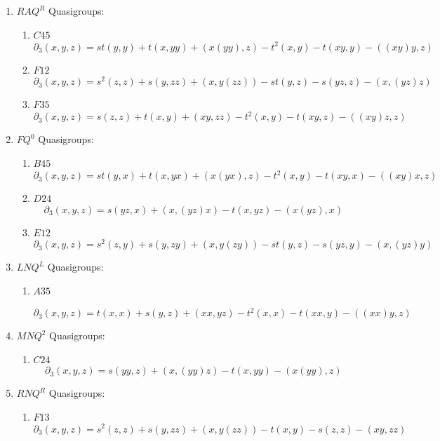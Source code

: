 \documentclass[11pt]{amsart}
\theoremstyle{definition}
\begin{document}
\begin{enumerate}
\item[(22)] $RAQ^R$ Quasigroups:

    \begin{enumerate}
        \item $C45$
        \[ \partial_3(x,y,z)=st (y, y)  + 
 t (x, y y) + (x (y y), z)  - t^2 (x, y) - t(x y, y)    -((x y) y, z) \]
        \item $F12$
        \[ \partial_3(x,y,z)=s^2 (z, z) + s (y, z z) + (x, y (z z)) - st (y, z)  - s (y z, z)     - (x, (y z) z) \]
        \item $F35$
        \[ \partial_3(x,y,z)= s (z, z) + t (x, y) + (x y, z z)- t^2 (x, y)    - 
 t (x y, z)    - ((x y) z, z)   \]
    \end{enumerate}

\item[(23)] $FQ^0$ Quasigroups:

    \begin{enumerate}
        \item $B45$
        \[ \partial_3(x,y,z)=  st (y, x) + 
 t (x, y x) + (x (y x), z) - t^2 (x, y)   - t(x y, x)   -((x y) x, z)    \]
        \item $D24$
     \[ \partial_3(x,y,z)=  s (y z, x)  + (x, (y z) x) - t (x, y z)   -(x (y z), x) \]
        \item $E12$
        \[ \partial_3(x,y,z)= s^2 (z, y) + 
 s (y, z y) + (x, y (z y)) - st (y, z) - s (y z, y)     - (x, (y z) y)  \]
    \end{enumerate}

\item[(24)] $LNQ^L$ Quasigroups:

    \begin{enumerate}
        \item $A35$
 
 \[ \partial_3(x,y,z)= t(x,x) +s (y,z) + (x x, y z) -t^2(x,x)  - 
 t (x x, y)  -((x x) y, z)
\]
    \end{enumerate}

\item[(25)] $MNQ^2$ Quasigroups:

    \begin{enumerate}
        \item $C24$
        \[ \partial_3(x,y,z)=  s (y y, z) + (x, (y y) z)  - t (x, y y)    -(x (y y), z) \]
    \end{enumerate}

\item[(26)] $RNQ^R$ Quasigroups:

    \begin{enumerate}
        \item $F13$
        \[ \partial_3(x,y,z)= s^2 (z, z) + s (y, z z)  + (x, y (z z)) - t (x, y)   - s (z, z)    - (x y, z z)  \]
    \end{enumerate}
\end{enumerate}
\end{document}
